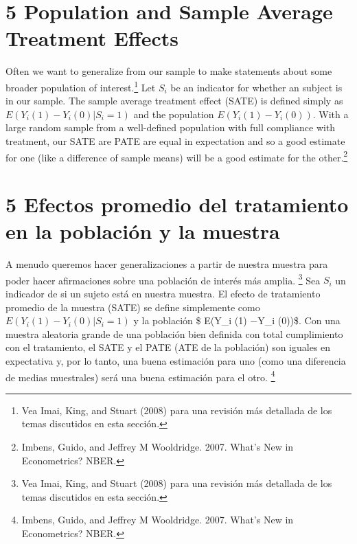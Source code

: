 \documentclass[
]{article}
\begin{document}
\hypertarget{population-and-sample-average-treatment-effects}{%
\section{5 Population and Sample Average Treatment
Effects}\label{population-and-sample-average-treatment-effects}}

Often we want to generalize from our sample to make statements about
some broader population of interest.\footnote{Vea Imai, King, and Stuart
  (2008) para una revisión más detallada de los temas discutidos en esta
  sección.} Let \(S_i\) be an indicator for whether an subject is in our
sample. The sample average treatment effect (SATE) is defined simply as
\(E(Y_i(1)−Y_i(0)|S_i=1)\) and the population \(E(Y_i(1)−Y_i(0))\). With
a large random sample from a well-defined population with full
compliance with treatment, our SATE are PATE are equal in expectation
and so a good estimate for one (like a difference of sample means) will
be a good estimate for the other.\footnote{Imbens, Guido, and Jeffrey M
  Wooldridge. 2007. What's New in Econometrics? NBER.}

\hypertarget{efectos-promedio-del-tratamiento-en-la-poblaciuxf3n-y-la-muestra}{%
\section{5 Efectos promedio del tratamiento en la población y la
muestra}\label{efectos-promedio-del-tratamiento-en-la-poblaciuxf3n-y-la-muestra}}

A menudo queremos hacer generalizaciones a partir de nuestra muestra
para poder hacer afirmaciones sobre una población de interés más amplia.
\footnote{Vea Imai, King, and Stuart (2008) para una revisión más
  detallada de los temas discutidos en esta sección.} Sea \(S_i\) un
indicador de si un sujeto está en nuestra muestra. El efecto de
tratamiento promedio de la muestra (SATE) se define simplemente como
\(E(Y_i (1) −Y_i(0) | S_i = 1)\) y la población \$ E(Y\_i (1) −Y\_i
(0))\$. Con una muestra aleatoria grande de una población bien definida
con total cumplimiento con el tratamiento, el SATE y el PATE (ATE de la
población) son iguales en expectativa y, por lo tanto, una buena
estimación para uno (como una diferencia de medias muestrales) será una
buena estimación para el otro. \footnote{Imbens, Guido, and Jeffrey M
  Wooldridge. 2007. What's New in Econometrics? NBER.}
\end{document}
